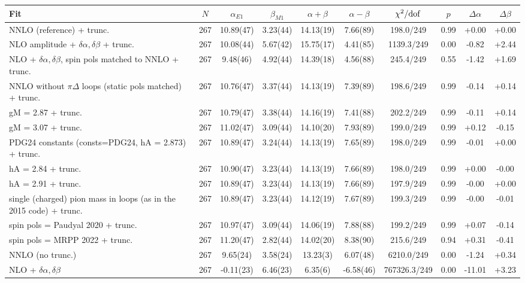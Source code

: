 \begin{tabular}{lccccccccc}
\hline
Fit & $N$ & $\alpha_{E1}$ & $\beta_{M1}$ & $\alpha+\beta$ & $\alpha-\beta$ & $\chi^2/{\rm dof}$ & $p$ & $\Delta\alpha$ & $\Delta\beta$ \\
\hline
NNLO (reference) + trunc. & 267 & 10.89(47) & 3.23(44) & 14.13(19) & 7.66(89) & 198.0/249 & 0.99 & +0.00 & +0.00 \\
NLO amplitude + $\delta\alpha,\delta\beta$ + trunc. & 267 & 10.08(44) & 5.67(42) & 15.75(17) & 4.41(85) & 1139.3/249 & 0.00 & -0.82 & +2.44 \\
NLO + $\delta\alpha,\delta\beta$, spin pols matched to NNLO + trunc. & 267 & 9.48(46) & 4.92(44) & 14.39(18) & 4.56(88) & 245.4/249 & 0.55 & -1.42 & +1.69 \\
NNLO without $\pi\Delta$ loops (static pols matched) + trunc. & 267 & 10.76(47) & 3.37(44) & 14.13(19) & 7.39(89) & 198.6/249 & 0.99 & -0.14 & +0.14 \\
gM = 2.87 + trunc. & 267 & 10.79(47) & 3.38(44) & 14.16(19) & 7.41(88) & 202.2/249 & 0.99 & -0.11 & +0.14 \\
gM = 3.07 + trunc. & 267 & 11.02(47) & 3.09(44) & 14.10(20) & 7.93(89) & 199.0/249 & 0.99 & +0.12 & -0.15 \\
PDG24 constants (consts=PDG24, hA = 2.873) + trunc. & 267 & 10.89(47) & 3.24(44) & 14.13(19) & 7.65(89) & 198.0/249 & 0.99 & -0.01 & +0.00 \\
hA = 2.84 + trunc. & 267 & 10.90(47) & 3.23(44) & 14.13(19) & 7.66(89) & 198.0/249 & 0.99 & +0.00 & -0.00 \\
hA = 2.91 + trunc. & 267 & 10.89(47) & 3.23(44) & 14.13(19) & 7.66(89) & 197.9/249 & 0.99 & -0.00 & +0.00 \\
single (charged) pion mass in loops (as in the 2015 code) + trunc. & 267 & 10.89(47) & 3.23(44) & 14.12(19) & 7.67(89) & 199.3/249 & 0.99 & -0.00 & -0.01 \\
spin pols = Paudyal 2020 + trunc. & 267 & 10.97(47) & 3.09(44) & 14.06(19) & 7.88(88) & 199.2/249 & 0.99 & +0.07 & -0.14 \\
spin pols = MRPP 2022 + trunc. & 267 & 11.20(47) & 2.82(44) & 14.02(20) & 8.38(90) & 215.6/249 & 0.94 & +0.31 & -0.41 \\
NNLO (no trunc.) & 267 & 9.65(24) & 3.58(24) & 13.23(3) & 6.07(48) & 6210.0/249 & 0.00 & -1.24 & +0.34 \\
NLO + $\delta\alpha,\delta\beta$ & 267 & -0.11(23) & 6.46(23) & 6.35(6) & -6.58(46) & 767326.3/249 & 0.00 & -11.01 & +3.23 \\

\end{tabular}
